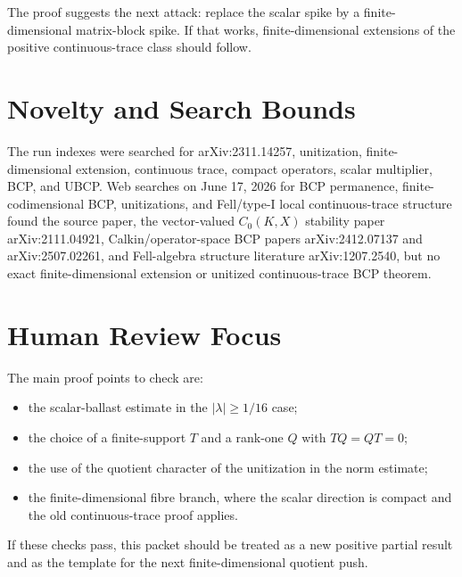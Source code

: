 \documentclass[11pt]{article}
\begin{document}
The proof suggests the next attack: replace the scalar spike by a
finite-dimensional matrix-block spike.  If that works, finite-dimensional
extensions of the positive continuous-trace class should follow.

\section*{Novelty and Search Bounds}

The run indexes were searched for arXiv:2311.14257, unitization,
finite-dimensional extension, continuous trace, compact operators, scalar
multiplier, BCP, and UBCP.  Web searches on June 17, 2026 for BCP permanence,
finite-codimensional BCP, unitizations, and Fell/type-I local continuous-trace
structure found the source paper, the vector-valued \(C_0(K,X)\) stability
paper arXiv:2111.04921, Calkin/operator-space BCP papers arXiv:2412.07137 and
arXiv:2507.02261, and Fell-algebra structure literature arXiv:1207.2540, but
no exact finite-dimensional extension or unitized continuous-trace BCP theorem.

\section*{Human Review Focus}

The main proof points to check are:

\begin{itemize}
\item the scalar-ballast estimate in the \(|\lambda|\ge1/16\) case;
\item the choice of a finite-support \(T\) and a rank-one \(Q\) with
      \(TQ=QT=0\);
\item the use of the quotient character of the unitization in the norm
      estimate;
\item the finite-dimensional fibre branch, where the scalar direction is
      compact and the old continuous-trace proof applies.
\end{itemize}

If these checks pass, this packet should be treated as a new positive partial
result and as the template for the next finite-dimensional quotient push.
\end{document}
